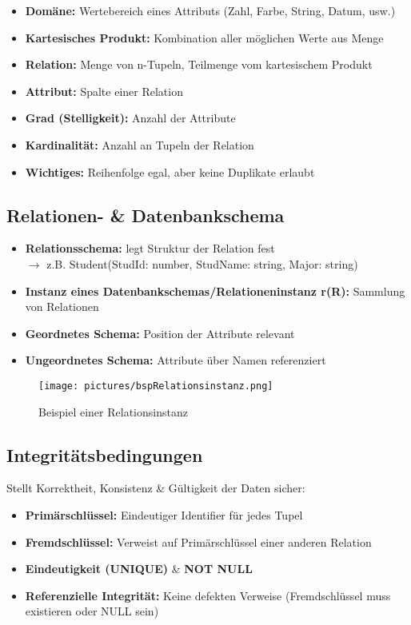 \documentclass[12pt,a4paper]{article}
\begin{document}
\begin{itemize}
\item \textbf{Domäne:} Wertebereich eines Attributs (Zahl, Farbe, String, Datum, usw.)
\item \textbf{Kartesisches Produkt:} Kombination aller möglichen Werte aus Menge
\item \textbf{Relation:} Menge von n-Tupeln, Teilmenge vom kartesischem Produkt
\item \textbf{Attribut:} Spalte einer Relation
\item \textbf{Grad (Stelligkeit):} Anzahl der Attribute
\item \textbf{Kardinalität:} Anzahl an Tupeln der Relation
\item \textbf{Wichtiges:} Reihenfolge egal, aber keine Duplikate erlaubt
\end{itemize}

\subsection{Relationen- \& Datenbankschema}

\begin{itemize}
\item \textbf{Relationsschema:} legt Struktur der Relation fest \\
$\rightarrow$ z.B. Student(StudId: number, StudName: string, Major: string)
\item \textbf{Instanz eines Datenbankschemas/Relationeninstanz r(R):} Sammlung von Relationen
\item \textbf{Geordnetes Schema:} Position der Attribute relevant
\item \textbf{Ungeordnetes Schema:} Attribute über Namen referenziert
\end{itemize}

\begin{figure}[H]
\centering
\texttt{[image: pictures/bspRelationsinstanz.png]}
\caption{Beispiel einer Relationsinstanz}
\end{figure}

\subsection{Integritätsbedingungen}

Stellt Korrektheit, Konsistenz \& Gültigkeit der Daten sicher:
\begin{itemize}
\item \textbf{Primärschlüssel:} Eindeutiger Identifier für jedes Tupel
\item \textbf{Fremdschlüssel:} Verweist auf Primärschlüssel einer anderen Relation
\item \textbf{Eindeutigkeit (UNIQUE)} \& \textbf{NOT NULL}
\item \textbf{Referenzielle Integrität:} Keine defekten Verweise (Fremdschlüssel muss existieren oder NULL sein)
\end{itemize}
\end{document}

